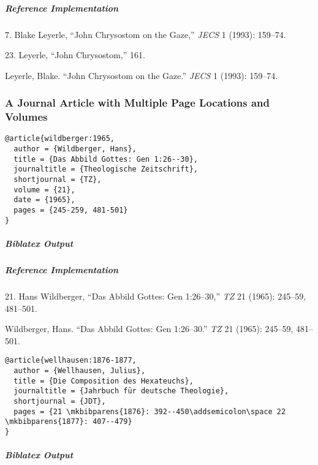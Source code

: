\documentclass[a4paper]{article}
\newenvironment{biboutput}{%
  \subparagraph{Biblatex Output}
}{\color{black}}
\newenvironment{refimp}{%
  \subparagraph{Reference Implementation}
  \color{reference-colour}
  \rm
}{\par\color{black}}
\begin{document}
\begin{refimp}
  7. Blake Leyerle, “John Chrysostom on the Gaze,” \emph{JECS} 1 (1993): 159–74.

  23. Leyerle, “John Chrysostom,” 161.

  \hangindent\bibindent Leyerle, Blake. “John Chrysostom on the Gaze.”
  \emph{JECS} 1 (1993): 159–74.

\end{refimp}

\subsubsection{A Journal Article with Multiple Page Locations and Volumes}

\begin{lstlisting}
@article{wildberger:1965,
  author = {Wildberger, Hans},
  title = {Das Abbild Gottes: Gen 1:26--30},
  journaltitle = {Theologische Zeitschrift},
  shortjournal = {TZ},
  volume = {21},
  date = {1965},
  pages = {245-259, 481-501}
}
\end{lstlisting}

\begin{biboutput}
\end{biboutput}

\begin{refimp}
  21. Hans Wildberger, “Das Abbild Gottes: Gen 1:26–30,” \emph{TZ} 21 (1965):
  245–59, 481–501.

  \hangindent\bibindent Wildberger, Hans. “Das Abbild Gottes: Gen 1:26–30.”
  \emph{TZ} 21 (1965): 245–59, 481–501.

\end{refimp}

\begin{lstlisting}
@article{wellhausen:1876-1877,
  author = {Wellhausen, Julius},
  title = {Die Composition des Hexateuchs},
  journaltitle = {Jahrbuch für deutsche Theologie},
  shortjournal = {JDT},
  pages = {21 \mkbibparens{1876}: 392--450\addsemicolon\space 22 \mkbibparens{1877}: 407--479}
}
\end{lstlisting}

\begin{biboutput}
\end{biboutput}
\end{document}
